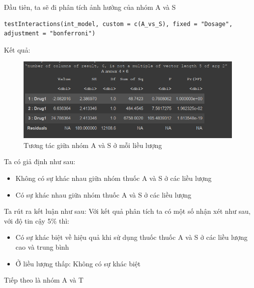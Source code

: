 \begin{itemize}
\begin{itemize}
        Đầu tiên, ta sẽ đi phân tích ảnh hưởng của nhóm A và S
        \begin{lstlisting}
testInteractions(int_model, custom = c(A_vs_S), fixed = "Dosage", adjustment = "bonferroni")
        \end{lstlisting}
        Kết quả:
        \begin{figure}[H]
            \centering
            \includegraphics[width=0.8\linewidth]{part01_figures/10.png}
            \caption{Tương tác giữa nhóm A và S ở mỗi liều lượng}
            \label{fig:Tương tác giữa nhóm A và S ở mỗi liều lượng}
        \end{figure}
        Ta có giả định như sau:
        \begin{itemize}
            \item Không có sự khác nhau giữa nhóm thuốc A và S ở các liều lượng
            \item Có sự khác nhau giữa nhóm thuốc A và S ở các liều lượng
        \end{itemize}
        Ta rút ra kết luận như sau: Với kết quả phân tích ta có một số nhận xét như sau, với độ tin cậy 5\% thì:
        \begin{itemize}
            \item Có sự khác biệt về hiệu quả khi sử dụng thuốc thuốc A và S ở các  liều lượng cao và trung bình
            \item Ở liều lượng thấp: Không có sự khác biệt
        \end{itemize}

        Tiếp theo là nhóm A và T
        

\end{itemize}
\end{itemize}
